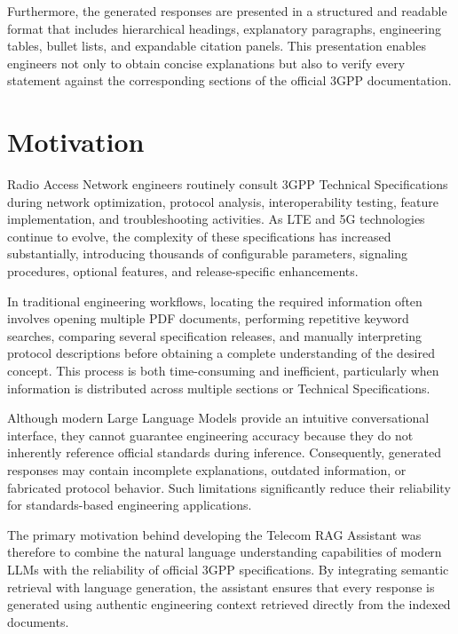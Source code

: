 Furthermore, the generated responses are presented in a structured and readable format that includes hierarchical headings, explanatory paragraphs, engineering tables, bullet lists, and expandable citation panels. This presentation enables engineers not only to obtain concise explanations but also to verify every statement against the corresponding sections of the official 3GPP documentation.

\section{Motivation}

Radio Access Network engineers routinely consult 3GPP Technical Specifications during network optimization, protocol analysis, interoperability testing, feature implementation, and troubleshooting activities. As LTE and 5G technologies continue to evolve, the complexity of these specifications has increased substantially, introducing thousands of configurable parameters, signaling procedures, optional features, and release-specific enhancements.

In traditional engineering workflows, locating the required information often involves opening multiple PDF documents, performing repetitive keyword searches, comparing several specification releases, and manually interpreting protocol descriptions before obtaining a complete understanding of the desired concept. This process is both time-consuming and inefficient, particularly when information is distributed across multiple sections or Technical Specifications.

Although modern Large Language Models provide an intuitive conversational interface, they cannot guarantee engineering accuracy because they do not inherently reference official standards during inference. Consequently, generated responses may contain incomplete explanations, outdated information, or fabricated protocol behavior. Such limitations significantly reduce their reliability for standards-based engineering applications.

The primary motivation behind developing the Telecom RAG Assistant was therefore to combine the natural language understanding capabilities of modern LLMs with the reliability of official 3GPP specifications. By integrating semantic retrieval with language generation, the assistant ensures that every response is generated using authentic engineering context retrieved directly from the indexed documents.

